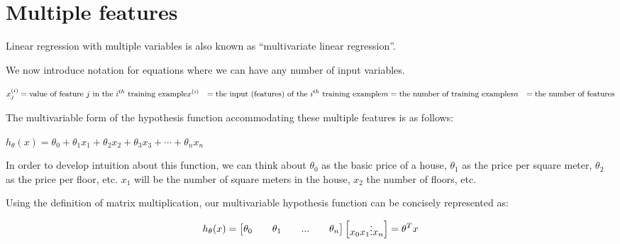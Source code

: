 \documentclass[
]{book}
\begin{document}
\hypertarget{multiple-features}{%
\section{Multiple features}\label{multiple-features}}

Linear regression with multiple variables is also known as ``multivariate linear regression''.

We now introduce notation for equations where we can have any number of input variables.

\begin{align*}x_j^{(i)} &= \text{value of feature } j \text{ in the }i^{th}\text{ training example} \newline x^{(i)}& = \text{the input (features) of the }i^{th}\text{ training example} \newline m &= \text{the number of training examples} \newline n &= \text{the number of features} \end{align*}

The multivariable form of the hypothesis function accommodating these multiple features is as follows:

\(h_\theta (x) = \theta_0 + \theta_1 x_1 + \theta_2 x_2 + \theta_3 x_3 + \cdots + \theta_n x_n\)

In order to develop intuition about this function, we can think about \(\theta_0\) as the basic price of a house, \(\theta_1\) as the price per square meter, \(\theta_2\) as the price per floor, etc. \(x_1\) will be the number of square meters in the house, \(x_2\) the number of floors, etc.

Using the definition of matrix multiplication, our multivariable hypothesis function can be concisely represented as:

\begin{align*}h_\theta(x) =\begin{bmatrix}\theta_0 \hspace{2em} \theta_1 \hspace{2em} ... \hspace{2em} \theta_n\end{bmatrix}\begin{bmatrix}x_0 \newline x_1 \newline \vdots \newline x_n\end{bmatrix}= \theta^T x\end{align*}
\end{document}
